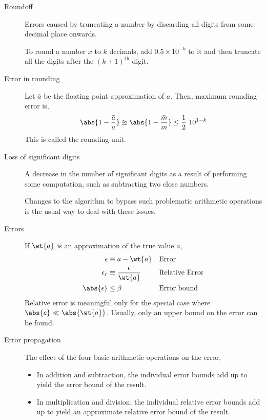 \begin{description}
    \item[Roundoff] Errors caused by truncating a number by discarding all digits
        from some decimal place onwards. \par
        To round a number $ x $ to $ k $ decimals, add $ 0.5 \times 10^{-k} $ to it and
        then truncate all the digits after the $ (k+1)^{\text{th}} $ digit.

    \item[Error in rounding] Let $ \bar{a} $ be the floating point approximation of
        $ a $. Then, maximum rounding error is,
        \begin{align}
            \abs{1 - \frac{\bar{a}}{a}} \approxeq \abs{1 - \frac{\bar{m}}{m}}
            \leq \frac{1}{2}\ 10^{1-k}
        \end{align}
        This is called the rounding unit.

    \item[Loss of significant digits] A decrease in the number of significant digits as
        a result of performing some computation, such as subtracting two close numbers.
        \par Changes to the algorithm to bypass such problematic arithmetic operations
        is the usual way to deal with these issues.

    \item[Errors] If $ \wt{a} $ is an approximation of the true value $ a $,
        \begin{align}
            \epsilon       & \equiv a - \wt{a}              &
                           & \text{Error}                     \\
            \epsilon_r     & \equiv \frac{\epsilon}{\wt{a}} &
                           & \text{Relative Error}            \\
            \abs{\epsilon} & \leq \beta                     &
                           & \text{Error bound}
        \end{align}
        Relative error is meaningful only for the special case where
        $ \abs{e} \ll \abs{\wt{a}} $. Usually, only an upper bound on the error can
        be found.

    \item[Error propagation] The effect of the four basic arithmetic operations on the
        error,
        \begin{itemize}
            \item In addition and subtraction, the individual error bounds add up to
                  yield the error bound of the result.
            \item In multiplication and division, the individual relative error bounds
                  add up to yield an approximate relative error bound of the result.
        \end{itemize}


\end{description}

